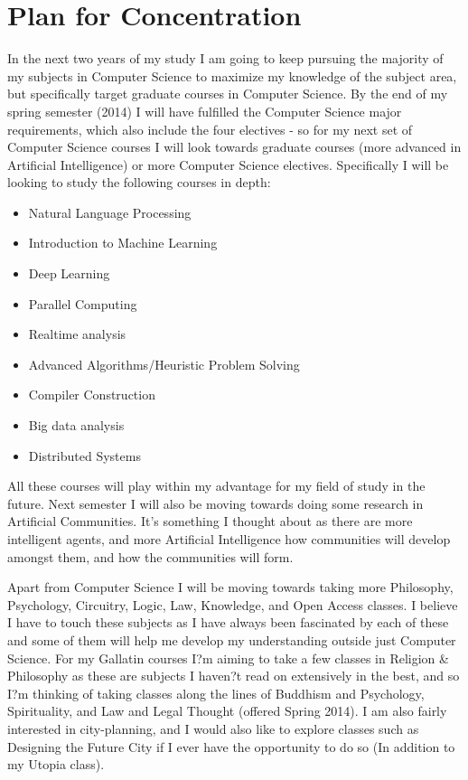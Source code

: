\documentclass[11pt, oneside]{article}   	%
\begin{document}
\section{Plan for Concentration}

\par In the next two years of my study I am going to keep pursuing the majority of my subjects in Computer Science to maximize my knowledge of the subject area, but specifically target graduate courses in Computer Science. By the end of my spring semester (2014) I will have fulfilled the Computer Science major requirements, which also include the four electives - so for my next set of Computer Science courses I will look towards graduate courses (more advanced in Artificial Intelligence) or more Computer Science electives. Specifically I will be looking to study the following courses in depth:

\begin{itemize}
\item Natural Language Processing
\item Introduction to Machine Learning
\item Deep Learning
\item Parallel Computing
\item Realtime analysis
\item Advanced Algorithms/Heuristic Problem Solving 
\item Compiler Construction
\item Big data analysis
\item Distributed Systems
\end{itemize}

\par All these courses will play within my advantage for my field of study in the future. Next semester I will also be moving towards doing some research in Artificial Communities. It's something I thought about as there are more intelligent agents, and more Artificial Intelligence how communities will develop amongst them, and how the communities will form.

\par Apart from Computer Science I will be moving towards taking more Philosophy, Psychology, Circuitry, Logic, Law, Knowledge, and Open Access classes. I believe I have to touch these subjects as I have always been fascinated by each of these and some of them will help me develop my understanding outside just Computer Science. For my Gallatin courses I?m aiming to take a few classes in Religion \& Philosophy as these are subjects I haven?t read on extensively in the best, and so I?m thinking of taking classes along the lines of Buddhism and Psychology, Spirituality, and Law and Legal Thought (offered Spring 2014). I am also fairly interested in city-planning, and I would also like to explore classes such as Designing the Future City if I ever have the opportunity to do so (In addition to my Utopia class).
\end{document}
